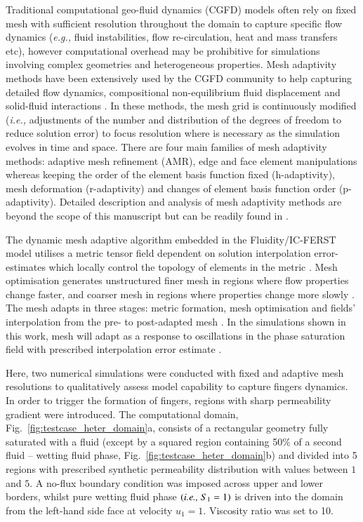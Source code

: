 \documentclass[preprint,authoryear,12pt]{elsarticle}
\newcommand{\eg}{{\it e.g., }}
\newcommand{\ie}{{\it i.e., }}
\begin{document}
\medskip
Traditional computational geo-fluid dynamics (CGFD) models often rely on fixed mesh with sufficient resolution throughout the domain to capture specific flow dynamics (\eg fluid instabilities, flow re-circulation, heat and mass transfers etc), however computational overhead may be prohibitive for simulations involving complex geometries and heterogeneous properties.  Mesh adaptivity methods have been extensively used by the CGFD community to help capturing detailed flow dynamics, compositional non-equilibrium fluid displacement and solid-fluid interactions \citep{pluszny_2007,pietro_2014,su_2016,melnikova_2016}. In these methods, the mesh grid is continuously modified (\ie adjustments of the number and distribution of the degrees of freedom to reduce solution error) to focus resolution where is necessary as the simulation evolves in time and space. There are four main families of mesh adaptivity methods: adaptive mesh refinement (AMR), edge and face element manipulations whereas keeping the order of the element basis function fixed (h-adaptivity), mesh deformation (r-adaptivity) and changes of element basis function order (p-adaptivity). Detailed description and analysis of mesh adaptivity methods are beyond the scope of this manuscript but can be readily found in \citet{lo_book} \citep[see also][]{plewa_book,frey_book}.  

\medskip
The dynamic mesh adaptive algorithm embedded in the Fluidity/IC-FERST model utilises a metric tensor field dependent on solution interpolation error-estimates which locally control the topology of elements in the metric \citep{pain_2001,power_2006}. Mesh optimisation generates unstructured finer mesh in regions where flow properties change faster, and coarser mesh in regions where properties change more slowly \citep{piggott_2006}. The mesh adapts in three stages: metric formation, mesh optimisation and fields' interpolation from the pre- to post-adapted mesh \citep[see][]{hiester_2014}. In the simulations shown in this work, mesh will adapt as a response to oscillations in the phase saturation field with prescribed interpolation error estimate \citep{mostaghimi_2016}.

\medskip
Here, two numerical simulations were conducted with fixed and adaptive mesh resolutions to qualitatively assess model capability to capture fingers dynamics. In order to trigger the formation of fingers, regions with sharp permeability gradient were introduced. The computational domain, Fig.~\ref{fig:testcase_heter_domain}a, consists of a rectangular geometry fully saturated with a fluid (except by a squared region containing 50$\%$ of a second fluid -- wetting fluid phase, Fig.~\ref{fig:testcase_heter_domain}b) and divided into 5 regions with prescribed synthetic permeability distribution with values between $1$ and $5$. A no-flux boundary condition was imposed across upper and lower borders, whilst pure wetting fluid phase $\left(\text{\ie} S_{1}=1\right)$ is driven into the domain from the left-hand side face at velocity $u_{1}=1$. Viscosity ratio was set to 10.
\end{document}
